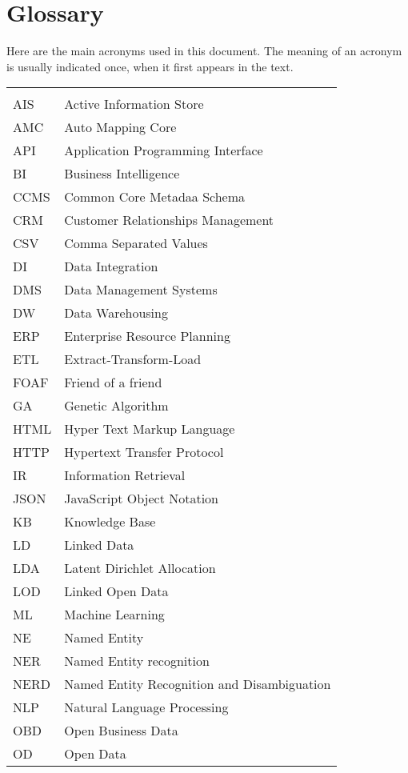 \chapter*{Glossary}

Here are the main acronyms used in this document. The meaning of an acronym is usually indicated once, when it first appears in the text.

\begin{longtable}{lp{9cm}}
 &\\
 AIS & Active Information Store \\
 AMC & Auto Mapping Core \\
 API  &   Application Programming Interface \\
 BI & Business Intelligence\\
 CCMS & Common Core Metadaa Schema \\
 CRM & Customer Relationships Management\\
 CSV & Comma Separated Values\\
 DI & Data Integration \\
 DMS & Data Management Systems\\
 DW & Data Warehousing \\
 ERP &  Enterprise Resource Planning\\
 ETL & Extract-Transform-Load \\
 FOAF & Friend of a friend \\
 GA & Genetic Algorithm \\
 HTML &   Hyper Text Markup Language\\
 HTTP & Hypertext Transfer Protocol \\
 IR & Information Retrieval \\
 JSON & JavaScript Object Notation \\
 KB & Knowledge Base \\
 LD & Linked Data\\
 LDA & Latent Dirichlet Allocation \\
 LOD & Linked Open Data \\
 ML & Machine Learning \\
 NE & Named Entity \\
 NER & Named Entity recognition\\
 NERD & Named Entity Recognition and Disambiguation \\
 NLP & Natural Language Processing \\
 OBD & Open Business Data\\
 OD & Open Data\\

\end{longtable}
